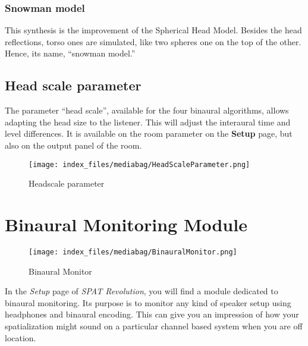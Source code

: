 \documentclass[
  letterpaper,
  DIV=11,
  numbers=noendperiod]{scrreport}
\begin{document}
\hypertarget{snowman-model}{%
\subsubsection{Snowman model}\label{snowman-model}}

This synthesis is the improvement of the Spherical Head Model. Besides
the head reflections, torso ones are simulated, like two spheres one on
the top of the other. Hence, its name, ``snowman model.''

\hypertarget{head-scale-parameter}{%
\subsection{Head scale parameter}\label{head-scale-parameter}}

The parameter ``head scale'', available for the four binaural
algorithms, allows adapting the head size to the listener. This will
adjust the interaural time and level differences. It is available on the
room parameter on the \textbf{Setup} page, but also on the output panel
of the room.

\begin{figure}

{\centering \texttt{[image: index\_files/mediabag/HeadScaleParameter.png]}

}

\caption{Headscale parameter}

\end{figure}

\hypertarget{sec-binaural-monitoring}{%
\section{Binaural Monitoring Module}\label{sec-binaural-monitoring}}

\begin{figure}

{\centering \texttt{[image: index\_files/mediabag/BinauralMonitor.png]}

}

\caption{Binaural Monitor}

\end{figure}

In the \emph{Setup} page of \emph{SPAT Revolution}, you will find a
module dedicated to binaural monitoring. Its purpose is to monitor any
kind of speaker setup using headphones and binaural encoding. This can
give you an impression of how your spatialization might sound on a
particular channel based system when you are off location.
\end{document}
